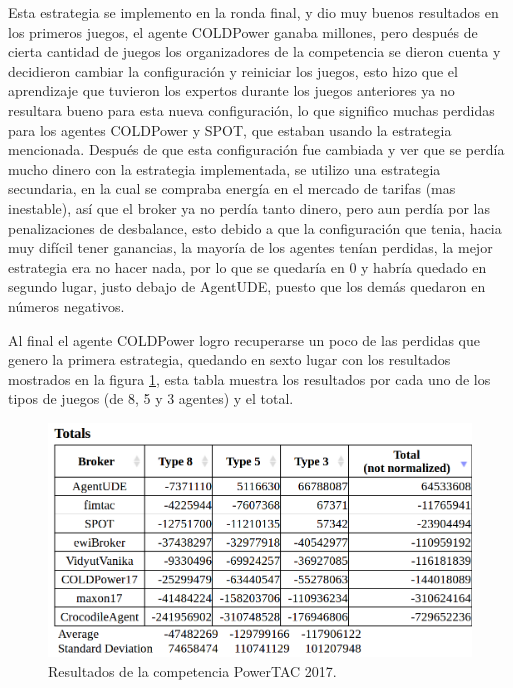 Esta estrategia se implemento en la ronda final, y dio muy buenos resultados en los primeros juegos, el agente COLDPower ganaba millones, pero después de cierta cantidad de juegos los organizadores de la competencia se dieron cuenta y decidieron cambiar la configuración y reiniciar los juegos, esto hizo que el aprendizaje que tuvieron los expertos durante los juegos anteriores ya no resultara bueno para esta nueva configuración, lo que significo muchas perdidas para los agentes COLDPower y SPOT, que estaban usando la estrategia mencionada.
Después de que esta configuración fue cambiada y ver que se perdía mucho dinero con la estrategia implementada, se utilizo una estrategia secundaria, en la cual se compraba energía en el mercado de tarifas (mas inestable), así que el broker ya no perdía tanto dinero, pero aun perdía por las penalizaciones de desbalance, esto debido a que la configuración que tenia, hacia muy difícil tener ganancias, la mayoría de los agentes tenían perdidas, la mejor estrategia era no hacer nada, por lo que se quedaría en 0 y habría quedado en segundo lugar, justo debajo de AgentUDE, puesto que los demás quedaron en números negativos.

Al final el agente COLDPower logro recuperarse un poco de las perdidas que genero la primera estrategia, quedando en sexto lugar con los resultados mostrados en la figura \ref{fig:resultadosCompetencia}, esta tabla muestra los resultados por cada uno de los tipos de juegos (de 8, 5 y 3 agentes) y el total.

\begin{figure}[h]
	\centering
	\includegraphics[width=17cm]{img/resultadosCompetencia.png}
	\caption{Resultados de la competencia PowerTAC 2017. }
	\label{fig:resultadosCompetencia}
\end{figure}
